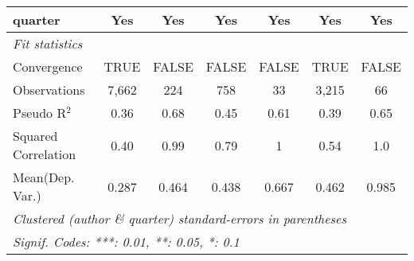 \begin{tabular}{lcccccc}
   quarter                                                    & Yes          & Yes           & Yes           & Yes           & Yes           & Yes\\  
   \midrule
   \emph{Fit statistics}\\
   Convergence                                                &TRUE          & FALSE         & FALSE         & FALSE         & TRUE          & FALSE\\  
   Observations                                               & 7,662        & 224           & 758           & 33            & 3,215         & 66\\  
   Pseudo R$^2$                                               & 0.36         & 0.68          & 0.45          & 0.61          & 0.39          & 0.65\\  
   Squared Correlation                                        & 0.40         & 0.99          & 0.79          & 1             & 0.54          & 1.0\\  
Mean(Dep. Var.) & 0.287 & 0.464 & 0.438 & 0.667 & 0.462 & 0.985 \\
   \midrule \midrule
   \multicolumn{7}{l}{\emph{Clustered (author \& quarter) standard-errors in parentheses}}\\
   \multicolumn{7}{l}{\emph{Signif. Codes: ***: 0.01, **: 0.05, *: 0.1}}\\
\end{tabular}
\par\endgroup
